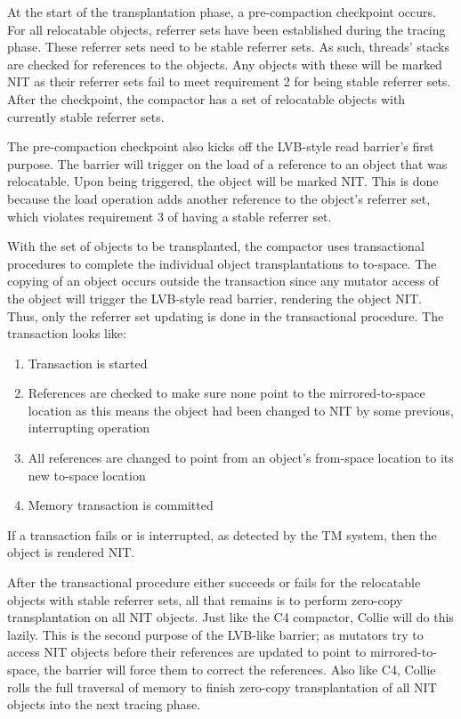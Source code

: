 \documentclass{sig-alternate}
\begin{document}
At the start of the transplantation phase, a pre-compaction checkpoint occurs.
For all relocatable objects, referrer sets have been established during the tracing phase.
These referrer sets need to be stable referrer sets. As such, threads' stacks are checked 
for references to the objects. Any objects with these will be 
marked NIT as their referrer sets fail to meet requirement 2 for being stable referrer sets.
After the checkpoint, the compactor has a set of relocatable objects with currently stable referrer sets.

The pre-compaction checkpoint also kicks off the LVB-style read barrier's first purpose. 
The barrier will trigger on the load of a reference to an object that was 
relocatable. Upon being triggered, the object will be marked NIT. This is done because
the load operation adds another reference to the object's referrer set, which violates
requirement 3 of having a stable referrer set.

With the set of objects to be transplanted, the compactor uses transactional
procedures to complete the individual object transplantations to to-space.
The copying of an object occurs outside the transaction since any
mutator access of the object will trigger the LVB-style read barrier,
rendering the object NIT. Thus, only the referrer set updating
is done in the transactional procedure. The transaction looks like:
\begin{enumerate}
\item Transaction is started
\item References are checked to make sure none point to the mirrored-to-space location as this means the object had been changed to NIT by some previous, interrupting operation
\item All references are changed to point from an object's from-space location to its new to-space location
\item Memory transaction is committed
\end{enumerate}
If a transaction fails or is interrupted, as detected by the TM system, then the object is rendered NIT.

After the transactional procedure either succeeds or fails for the 
relocatable objects with stable referrer sets, all that remains is to perform zero-copy transplantation
on all NIT objects. Just like the C4 compactor, Collie will do this lazily. This is the second purpose
of the LVB-like barrier; as mutators try to access NIT objects before their references are updated to
point to mirrored-to-space, the barrier will force them to correct the references. Also like C4, Collie
rolls the full traversal of memory to finish zero-copy transplantation of all NIT objects into the next
tracing phase.
\end{document}
